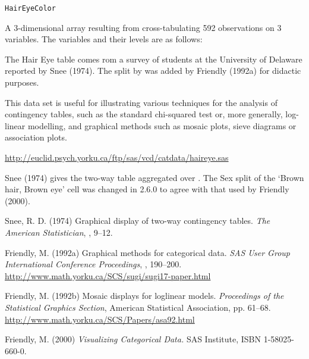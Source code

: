 %
\begin{Usage}
\begin{verbatim}
HairEyeColor
\end{verbatim}
\end{Usage}
%
\begin{Format}
A 3-dimensional array resulting from cross-tabulating 592 observations
on 3 variables.  The variables and their levels are as follows:


\end{Format}
%
\begin{Details}\relax
The Hair \eqn{\times}{} Eye table comes rom a survey of students at
the University of Delaware reported by Snee (1974).  The split by
 was added by Friendly (1992a) for didactic purposes.

This data set is useful for illustrating various techniques for the
analysis of contingency tables, such as the standard chi-squared test
or, more generally, log-linear modelling, and graphical methods such
as mosaic plots, sieve diagrams or association plots.
\end{Details}
%
\begin{Source}\relax
\url{http://euclid.psych.yorku.ca/ftp/sas/vcd/catdata/haireye.sas}

Snee (1974) gives the two-way table aggregated over .  The
Sex split of the `Brown hair, Brown eye' cell was changed in
\R{} 2.6.0 to agree with that used by Friendly (2000).
\end{Source}
%
\begin{References}\relax
Snee, R. D. (1974)
Graphical display of two-way contingency tables.
\emph{The American Statistician}, , 9--12.

Friendly, M. (1992a)
Graphical methods for categorical data.
\emph{SAS User Group International Conference Proceedings}, ,
190--200.
\url{http://www.math.yorku.ca/SCS/sugi/sugi17-paper.html}

Friendly, M. (1992b)
Mosaic displays for loglinear models.
\emph{Proceedings of the Statistical Graphics Section},
American Statistical Association, pp. 61--68.
\url{http://www.math.yorku.ca/SCS/Papers/asa92.html}

Friendly, M. (2000)
\emph{Visualizing Categorical Data.}
SAS Institute, ISBN 1-58025-660-0.
\end{References}
